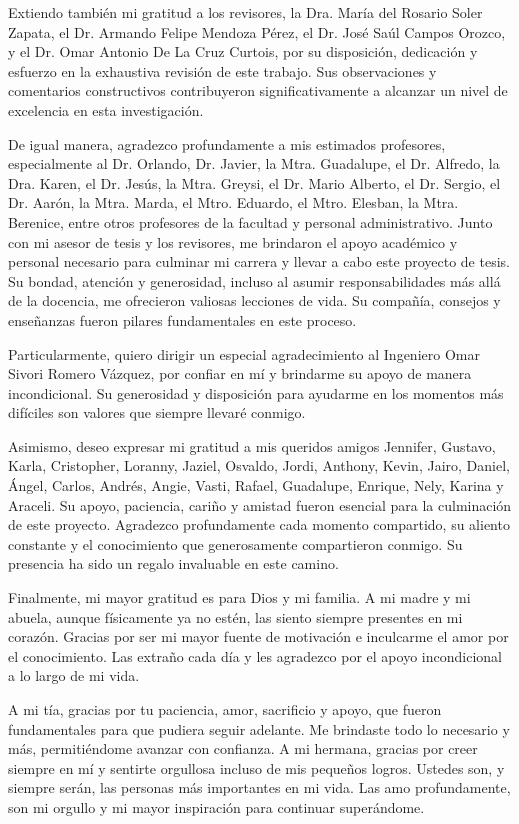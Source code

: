 \documentclass[
  us-letterpaper,
]{scrreprt}
\theoremstyle{plain}
\theoremstyle{plain}
\theoremstyle{definition}
\theoremstyle{remark}
\begin{document}
Extiendo también mi gratitud a los revisores, la Dra. María del Rosario Soler Zapata, el Dr. Armando Felipe Mendoza Pérez, el Dr. José Saúl Campos Orozco, y el Dr. Omar Antonio De La Cruz Curtois, por su disposición, dedicación y esfuerzo en la exhaustiva revisión de este trabajo. Sus observaciones y comentarios constructivos contribuyeron significativamente a alcanzar un nivel de excelencia en esta investigación.

De igual manera, agradezco profundamente a mis estimados profesores, especialmente al Dr. Orlando, Dr. Javier, la Mtra. Guadalupe, el Dr. Alfredo, la Dra. Karen, el Dr. Jesús, la Mtra. Greysi, el Dr. Mario Alberto, el Dr. Sergio, el Dr. Aarón, la Mtra. Marda, el Mtro. Eduardo, el Mtro. Elesban, la Mtra. Berenice, entre otros profesores de la facultad y personal administrativo. Junto con mi asesor de tesis y los revisores, me brindaron el apoyo académico y personal necesario para culminar mi carrera y llevar a cabo este proyecto de tesis. Su bondad, atención y generosidad, incluso al asumir responsabilidades más allá de la docencia, me ofrecieron valiosas lecciones de vida. Su compañía, consejos y enseñanzas fueron pilares fundamentales en este proceso.

Particularmente, quiero dirigir un especial agradecimiento al Ingeniero Omar Sivori Romero Vázquez, por confiar en mí y brindarme su apoyo de manera incondicional. Su generosidad y disposición para ayudarme en los momentos más difíciles son valores que siempre llevaré conmigo.

Asimismo, deseo expresar mi gratitud a mis queridos amigos Jennifer, Gustavo, Karla, Cristopher, Loranny, Jaziel, Osvaldo, Jordi, Anthony, Kevin, Jairo, Daniel, Ángel, Carlos, Andrés, Angie, Vasti, Rafael, Guadalupe, Enrique, Nely,  Karina y Araceli. Su apoyo, paciencia, cariño y amistad fueron esencial para la culminación de este proyecto. Agradezco profundamente cada momento compartido, su aliento constante y el conocimiento que generosamente compartieron conmigo. Su presencia ha sido un regalo invaluable en este camino.

Finalmente, mi mayor gratitud es para Dios y mi familia. A mi madre y mi abuela, aunque físicamente ya no estén, las siento siempre presentes en mi corazón. Gracias por ser mi mayor fuente de motivación e inculcarme el amor por el conocimiento. Las extraño cada día y les agradezco por el apoyo incondicional a lo largo de mi vida.

A mi tía, gracias por tu paciencia, amor, sacrificio y apoyo, que fueron fundamentales para que pudiera seguir adelante. Me brindaste todo lo necesario y más, permitiéndome avanzar con confianza. A mi hermana, gracias por creer siempre en mí y sentirte orgullosa incluso de mis pequeños logros. Ustedes son, y siempre serán, las personas más importantes en mi vida. Las amo profundamente, son mi orgullo y mi mayor inspiración para continuar superándome.
\end{document}
